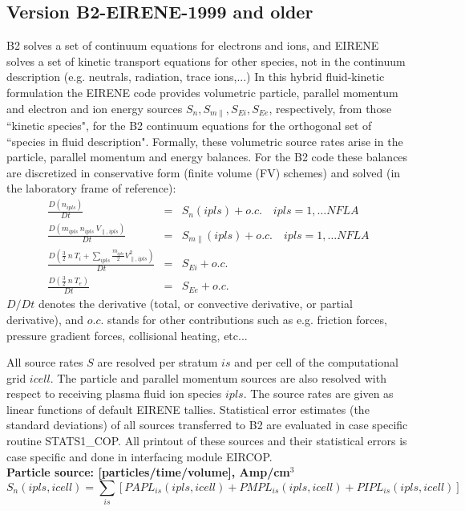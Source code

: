 \subsection{Version B2-EIRENE-1999 and older} \label{sec2.14.1}
\medskip
B2 solves a set of continuum equations for electrons and ions, and EIRENE solves a set of kinetic transport equations
for other species, not in the continuum description (e.g. neutrals, radiation, trace ions,...)
In this hybrid fluid-kinetic formulation the EIRENE code provides
volumetric particle, parallel momentum and electron and ion energy sources $S_n, S_{m\parallel}, S_{Ei}, S_{Ee}$, respectively,
from those ``kinetic species", for the B2 continuum equations for the orthogonal set of ``species in fluid description".
Formally, these volumetric source rates arise in the particle, parallel momentum and energy balances. For the B2 code these balances
are discretized in conservative form (finite volume (FV) schemes) and solved (in the laboratory frame of reference):
\begin{eqnarray}
\frac{D(n_{ipls})}{Dt} &=& S_n(ipls) +  o.c. \quad   ipls=1,\dots NFLA\\
\frac{D ( m_{ipls} \ n_{ipls} \ V_{\parallel,{ipls}})}{Dt}&=& S_{m\parallel}(ipls) + o.c. \quad   ipls=1,\dots NFLA\\
\frac{D (\frac32 \ n \ T_i+\sum_{ipls}\frac{m_{ipls}}{2} V^2_{\parallel,ipls})}{Dt} &=& S_{Ei} + o.c.\\
\frac{D (\frac32 \ n \ T_e)}{Dt} &=& S_{Ee} + o.c.
\end{eqnarray}
$D/Dt$ denotes the derivative (total, or convective derivative, or partial derivative), and $o.c.$ stands for other contributions such as e.g. friction forces, pressure gradient forces,
collisional heating, etc...

All source rates $S$ are resolved per stratum $is$ and per cell of the computational grid $icell$.
The particle and parallel momentum sources are also resolved with respect to receiving plasma fluid ion species $ipls$.
The source rates are given as linear functions of default EIRENE tallies.
Statistical error estimates (the standard deviations) of all sources transferred to B2 are evaluated in case specific routine STATS1\_COP. All printout of these sources
and their statistical errors is case specific and done in interfacing module EIRCOP.\\
\textbf{Particle source: [particles/time/volume], Amp/cm$^3$ }
 \begin{equation}
 S_n(ipls,icell) = \sum_{is} \left[PAPL_{is}(ipls,icell) + PMPL_{is}(ipls,icell) + PIPL_{is}(ipls,icell) \right]
 \end{equation}

